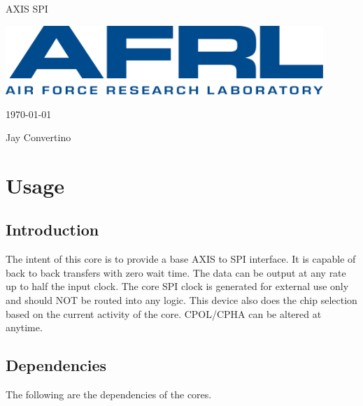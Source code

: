 \begin{titlepage}
  \begin{center}

  {\Huge AXIS SPI}

  \vspace{25mm}

  \includegraphics[width=0.90\textwidth,height=\textheight,keepaspectratio]{img/AFRL.png}

  \vspace{25mm}

  \today

  \vspace{15mm}

  {\Large Jay Convertino}

  \end{center}
\end{titlepage}

\tableofcontents

\newpage

\section{Usage}

\subsection{Introduction}

\par
The intent of this core is to provide a base AXIS to SPI interface. It is capable of back to back transfers with zero wait time.
The data can be output at any rate up to half the input clock. The core SPI clock is generated for external use only and should
NOT be routed into any logic. This device also does the chip selection based on the current activity of the core. CPOL/CPHA can
be altered at anytime.

\subsection{Dependencies}

\par
The following are the dependencies of the cores.

